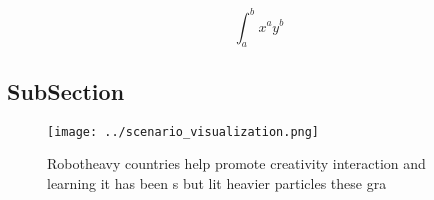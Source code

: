 \documentclass[a4paper]{article}
\begin{document}
\[ \int_{a}^{b}{x^{a}y^{b}} \]

\subsection{SubSection}

\begin{figure}
\centering
\texttt{[image: ../scenario\_visualization.png]}
\caption{Robotheavy countries help promote creativity interaction and learning it has been s but lit heavier particles these gra
}
\end{figure}
 
\end{document}
